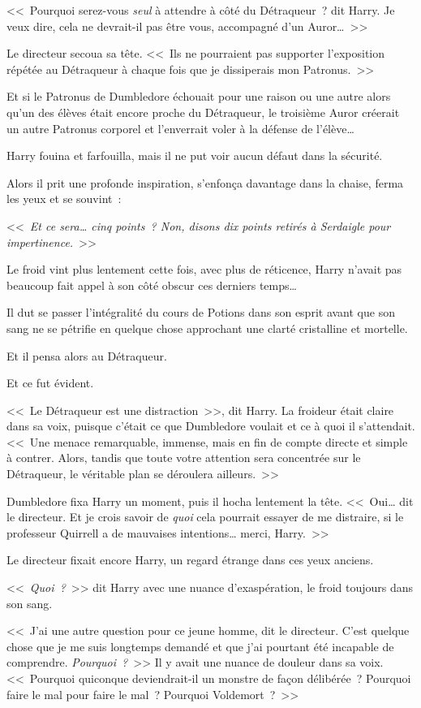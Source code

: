 <<~Pourquoi serez-vous \emph{seul} à attendre à côté du Détraqueur~? dit Harry. Je veux dire, cela ne devrait-il pas être vous, accompagné d'un Auror…~>>

Le directeur secoua sa tête. <<~Ils ne pourraient pas supporter l'exposition répétée au Détraqueur à chaque fois que je dissiperais mon Patronus.~>>

Et si le Patronus de Dumbledore échouait pour une raison ou une autre alors qu'un des élèves était encore proche du Détraqueur, le troisième Auror créerait un autre Patronus corporel et l'enverrait voler à la défense de l'élève…

Harry fouina et farfouilla, mais il ne put voir aucun défaut dans la sécurité.

Alors il prit une profonde inspiration, s'enfonça davantage dans la chaise, ferma les yeux et se souvint~:

<<~\emph{Et ce sera… cinq points~? Non, disons dix points retirés à Serdaigle pour impertinence.}~>>

Le froid vint plus lentement cette fois, avec plus de réticence, Harry n'avait pas beaucoup fait appel à son côté obscur ces derniers temps…

Il dut se passer l'intégralité du cours de Potions dans son esprit avant que son sang ne se pétrifie en quelque chose approchant une clarté cristalline et mortelle.

Et il pensa alors au Détraqueur.

Et ce fut évident.

<<~Le Détraqueur est une distraction~>>, dit Harry. La froideur était claire dans sa voix, puisque c'était ce que Dumbledore voulait et ce à quoi il s'attendait. <<~Une menace remarquable, immense, mais en fin de compte directe et simple à contrer. Alors, tandis que toute votre attention sera concentrée sur le Détraqueur, le véritable plan se déroulera ailleurs.~>>

Dumbledore fixa Harry un moment, puis il hocha lentement la tête. <<~Oui… dit le directeur. Et je crois savoir de \emph{quoi} cela pourrait essayer de me distraire, si le professeur Quirrell a de mauvaises intentions… merci, Harry.~>>

Le directeur fixait encore Harry, un regard étrange dans ces yeux anciens.

<<~\emph{Quoi~?}~>> dit Harry avec une nuance d'exaspération, le froid toujours dans son sang.

<<~J'ai une autre question pour ce jeune homme, dit le directeur. C'est quelque chose que je me suis longtemps demandé et que j'ai pourtant été incapable de comprendre. \emph{Pourquoi~?}~>> Il y avait une nuance de douleur dans sa voix. <<~Pourquoi quiconque deviendrait-il un monstre de façon délibérée~? Pourquoi faire le mal pour faire le mal~? Pourquoi Voldemort~?~>>


